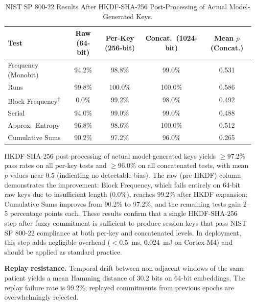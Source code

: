 \documentclass[sensors,article,submit,pdftex,moreauthors]{Definitions/mdpi}
\begin{document}
\begin{table}[H]
\caption{NIST SP 800-22 Results After HKDF-SHA-256 Post-Processing of Actual Model-Generated Keys.\label{tab:nist_hkdf}}
\begin{tabularx}{\textwidth}{lCCCC}
\toprule
\textbf{Test} & \textbf{Raw (64-bit)} & \textbf{Per-Key (256-bit)} & \textbf{Concat.\ (1024-bit)} & \textbf{Mean $p$ (Concat.)} \\
\midrule
Frequency (Monobit) & 94.2\% & 98.8\% & 99.0\% & 0.531 \\
Runs & 99.8\% & 100.0\% & 100.0\% & 0.586 \\
Block Frequency\textsuperscript{$\dagger$} & 0.0\% & 99.2\% & 98.0\% & 0.492 \\
Serial & 94.0\% & 99.0\% & 99.0\% & 0.488 \\
Approx.\ Entropy & 96.8\% & 98.6\% & 100.0\% & 0.512 \\
Cumulative Sums & 90.2\% & 97.2\% & 96.0\% & 0.265 \\
\bottomrule
\end{tabularx}
\end{table}

HKDF-SHA-256 post-processing of actual model-generated keys yields $\geq$97.2\% pass rates on all per-key tests and $\geq$96.0\% on all concatenated tests, with mean $p$-values near 0.5 (indicating no detectable bias). The raw (pre-HKDF) column demonstrates the improvement: Block Frequency, which fails entirely on 64-bit raw keys due to insufficient length (0.0\%), reaches 99.2\% after HKDF expansion; Cumulative Sums improves from 90.2\% to 97.2\%, and the remaining tests gain 2--5 percentage points each. These results confirm that a single HKDF-SHA-256 step after fuzzy commitment is sufficient to produce session keys that pass NIST SP 800-22 compliance at both per-key and concatenated levels. In deployment, this step adds negligible overhead ($<$0.5~ms, 0.024~mJ on Cortex-M4) and should be applied as standard practice.

\textbf{Replay resistance.} Temporal drift between non-adjacent windows of the same patient yields a mean Hamming distance of 30.2 bits on 64-bit embeddings. The replay failure rate is 99.2\%; replayed commitments from previous epochs are overwhelmingly rejected.
\end{document}

